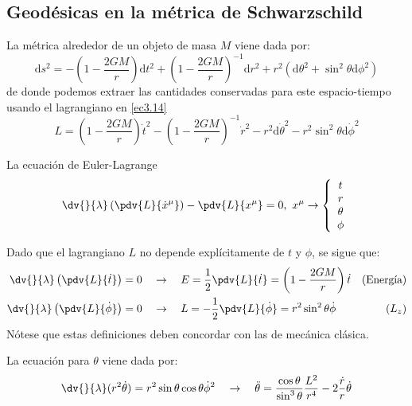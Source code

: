 \documentclass[../main]{subfiles}
\begin{document}
\begin{adjustwidth}{0pt}{-100pt}
\section{Geodésicas en la métrica de Schwarzschild}\label{part3.6}
La métrica alrededor de un objeto de masa $M$ viene dada por:
\begin{equation}
    \mathrm{d}s^2=-\left(1-\dfrac{2GM}{r}\right)\mathrm{d}t^2+\left(1-\dfrac{2GM}{r}\right)^{-1}\mathrm{d}r^2+r^2(\mathrm{d}\theta^2+\sin^2 \theta \mathrm{d}\phi^2)
\end{equation}
de donde podemos extraer las cantidades conservadas para este espacio-tiempo usando el lagrangiano en \eqref{ec3.14}
\begin{equation}
    L=\left(1-\dfrac{2GM}{r}\right)\dot{t}^2-\left(1-\dfrac{2GM}{r}\right)^{-1}\dot{r}^2-r^2\mathrm{d}\dot{\theta}^2-r^2\sin^2 \theta \mathrm{d}\dot{\phi}^2
\end{equation}

La ecuación de Euler-Lagrange
\begin{equation}
    \dv{}{\lambda}\left(\pdv{L}{\dot{x}^{\mu}}\right)-\pdv{L}{x^{\mu}}=0, \ x^{\mu}\rightarrow 
    \left\{
    \begin{array}{c}
       t\\
       r\\
       \theta\\
       \phi 
    \end{array}
    \right.
\end{equation}

Dado que el lagrangiano $L$ no depende explícitamente de $t$ y $\phi$, se sigue que:
\begin{align}
    \dv{}{\lambda}\left(\pdv{L}{\dot{t}}\right)&=0 \quad \rightarrow \quad E=\dfrac{1}{2}\pdv{L}{\dot{t}}=\left(1-\dfrac{2GM}{r}\right)\dot{t}  &(\text{Energía})\\
    \dv{}{\lambda}\left(\pdv{L}{\dot{\phi}}\right)&=0 \quad \rightarrow \quad L=-\dfrac{1}{2}\pdv{L}{\dot{\phi}}=r^2\sin^2 \theta \dot{\phi}  &(L_z) 
\end{align}
Nótese que estas definiciones deben concordar con las de mecánica clásica.

La ecuación para $\theta$ viene dada por:
\begin{equation}
    \dv{}{\lambda}(r^2 \dot{\theta})=r^2\sin \theta \cos \theta \dot{\phi}^2 \quad \rightarrow \quad \ddot{\theta}=\dfrac{\cos \theta}{\sin^3 \theta} \dfrac{L^2}{r^4}-2\dfrac{\dot{r}}{r}\dot{\theta}
\end{equation}


\end{adjustwidth}
\end{document}
